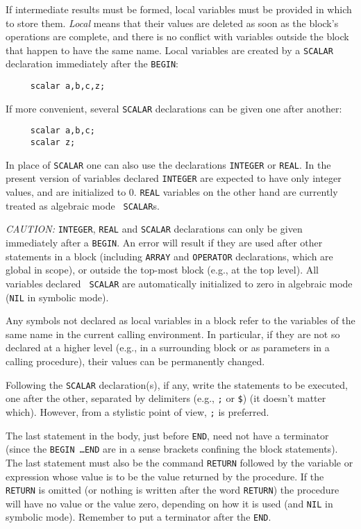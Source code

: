 If intermediate results must be formed, local variables must be provided
in which to store them. {\em Local\/} means that their values are deleted as
soon as the block's operations are complete, and there is no conflict with
variables outside the block that happen to have the same name.  Local
variables are created by a {\tt SCALAR} declaration
immediately after the {\tt BEGIN}:
\begin{verbatim}
     scalar a,b,c,z;
\end{verbatim}
If more convenient, several {\tt SCALAR} declarations can be given one after
another:
\begin{verbatim}
     scalar a,b,c;
     scalar z;
\end{verbatim}
In place of {\tt SCALAR} one can also use the declarations
{\tt INTEGER} or {\tt REAL}.  In the present
version of {\REDUCE} variables declared {\tt INTEGER} are expected to have
only integer values, and are initialized to 0. {\tt REAL}
variables on the other hand are currently treated as algebraic mode {\tt
SCALAR}s.

{\it CAUTION:} {\tt INTEGER}, {\tt REAL} and {\tt SCALAR} declarations can
only be given immediately after a {\tt BEGIN}.  An error will result if
they are used after other statements in a block (including {\tt ARRAY} and
{\tt OPERATOR} declarations, which are global in scope), or outside the
top-most block (e.g., at the top level).  All variables declared {\tt
SCALAR} are automatically initialized to zero in algebraic mode ({\tt NIL}
in symbolic mode).

Any symbols not declared as local variables in a block refer to the
variables of the same name in the current calling environment. In
particular, if they are not so declared at a higher level (e.g., in a
surrounding block or as parameters in a calling procedure), their values can
be permanently changed.

Following the {\tt SCALAR} declaration(s), if any, write the
statements to be executed, one after the other, separated by delimiters
(e.g., {\tt ;} or {\tt \$}) (it doesn't matter which).  However, from a
stylistic point of view, {\tt ;} is preferred.

The last statement in the body, just before {\tt END}, need not have a
terminator (since the {\tt BEGIN \ldots END} are in a sense brackets
confining the block statements).  The last statement must also be the
command {\tt RETURN} followed by the variable or
expression whose value is to be the value returned by the procedure.  If
the {\tt RETURN} is omitted (or nothing is written after the word
{\tt RETURN}) the procedure will have no value or the value zero, depending
on how it is used (and {\tt NIL} in symbolic mode).  Remember to put a
terminator after the {\tt END}.


